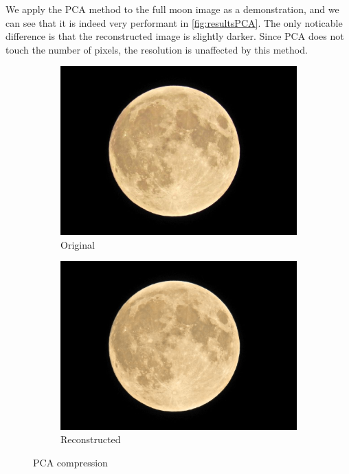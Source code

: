 We apply the PCA method to the full moon image as a demonstration, and we can see that it is indeed very performant in \autoref{fig:resultsPCA}. The only noticable difference is that the reconstructed image is slightly darker. Since PCA does not touch the number of pixels, the resolution is unaffected by this method. 
\begin{figure}[!ht]
    \centering
    \begin{subfigure}{0.45\textwidth}
    \centering
        \includegraphics[width=\linewidth]{Doc/Graphics/Part4/PCA_im_original.png}
        \caption{Original}
    \end{subfigure}
    \hfill
    \begin{subfigure}{0.45\textwidth}
    \centering
        \includegraphics[width=\linewidth]{Doc/Graphics/Part4/PCA_im_reconstructed.png}
        \caption{Reconstructed}
    \end{subfigure}
    \caption{PCA compression}
    \label{fig:resultsPCA}
\end{figure}
\FloatBarrier

